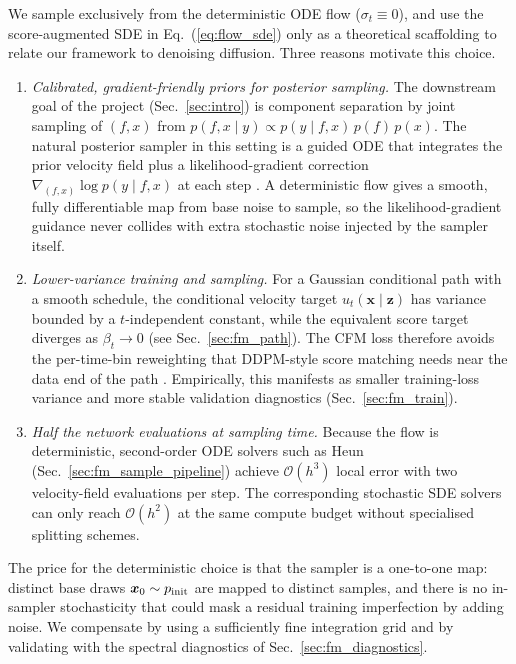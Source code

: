 \documentclass[11pt]{article}
\DeclareRobustCommand{\xvec}{\bm{x}}
\DeclareRobustCommand{\zvec}{\bm{z}}
\newcommand{\pinit}{p_{\rm init}}
\theoremstyle{definition}
\begin{document}
We sample exclusively from the deterministic ODE flow ($\sigma_t\equiv 0$), and use the score-augmented SDE in Eq.~(\ref{eq:flow_sde}) only as a theoretical scaffolding to relate our framework to denoising diffusion. Three reasons motivate this choice.
\begin{enumerate}[leftmargin=2.0em,itemsep=0.15em]
  \item \emph{Calibrated, gradient-friendly priors for posterior sampling.} The downstream goal of the project (Sec.~\ref{sec:intro}) is component separation by joint sampling of $(f,x)$ from $p(f,x\mid y)\propto p(y\mid f,x)\,p(f)\,p(x)$. The natural posterior sampler in this setting is a guided ODE that integrates the prior velocity field plus a likelihood-gradient correction $\nabla_{(f,x)}\log p(y\mid f,x)$ at each step \cite{chung2023dps,saharia2022sr3}. A deterministic flow gives a smooth, fully differentiable map from base noise to sample, so the likelihood-gradient guidance never collides with extra stochastic noise injected by the sampler itself.
  \item \emph{Lower-variance training and sampling.} For a Gaussian conditional path with a smooth schedule, the conditional velocity target $u_t(\xvec\mid\zvec)$ has variance bounded by a $t$-independent constant, while the equivalent score target diverges as $\beta_t\to 0$ (see Sec.~\ref{sec:fm_path}). The CFM loss therefore avoids the per-time-bin reweighting that DDPM-style score matching needs near the data end of the path \cite{ho2020ddpm,karras2022elucidating}. Empirically, this manifests as smaller training-loss variance and more stable validation diagnostics (Sec.~\ref{sec:fm_train}).
  \item \emph{Half the network evaluations at sampling time.} Because the flow is deterministic, second-order ODE solvers such as Heun (Sec.~\ref{sec:fm_sample_pipeline}) achieve $\mathcal O(h^3)$ local error with two velocity-field evaluations per step. The corresponding stochastic SDE solvers can only reach $\mathcal O(h^2)$ at the same compute budget without specialised splitting schemes.
\end{enumerate}
The price for the deterministic choice is that the sampler is a one-to-one map: distinct base draws $\xvec_0\sim\pinit$ are mapped to distinct samples, and there is no in-sampler stochasticity that could mask a residual training imperfection by adding noise. We compensate by using a sufficiently fine integration grid and by validating with the spectral diagnostics of Sec.~\ref{sec:fm_diagnostics}.
\end{document}
